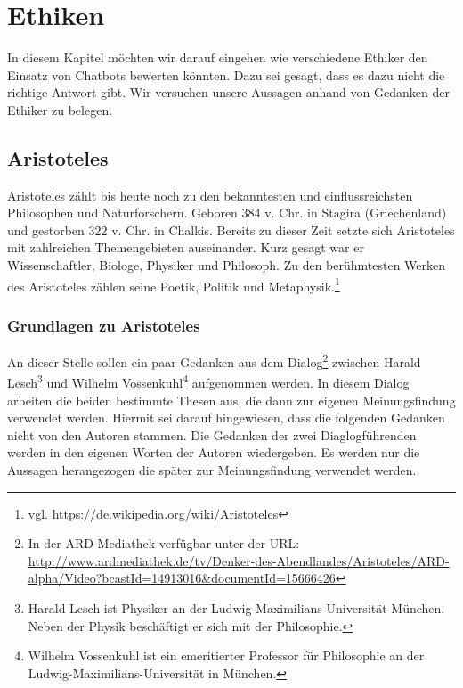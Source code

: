 \section{Ethiken}
In diesem Kapitel möchten wir darauf eingehen wie verschiedene Ethiker den Einsatz von Chatbots bewerten könnten. Dazu sei gesagt, dass es dazu nicht die richtige Antwort gibt. Wir versuchen unsere Aussagen anhand von Gedanken der Ethiker zu belegen. 

\subsection{Aristoteles}
Aristoteles zählt bis heute noch zu den bekanntesten und einflussreichsten Philosophen und Naturforschern. Geboren 384 v. Chr. in Stagira (Griechenland) und gestorben 322 v. Chr. in Chalkis. Bereits zu dieser Zeit setzte sich Aristoteles mit zahlreichen Themengebieten auseinander. Kurz gesagt war er Wissenschaftler, Biologe, Physiker und Philosoph. Zu den berühmtesten Werken des Aristoteles zählen seine Poetik, Politik und Metaphysik.\footnote{vgl. \url{https://de.wikipedia.org/wiki/Aristoteles}}


\subsubsection{Grundlagen zu Aristoteles}

An dieser Stelle sollen ein paar Gedanken aus dem Dialog\footnote{In der ARD-Mediathek verfügbar unter der URL: \url{http://www.ardmediathek.de/tv/Denker-des-Abendlandes/Aristoteles/ARD-alpha/Video?bcastId=14913016&documentId=15666426}} zwischen Harald Lesch\footnote{Harald Lesch ist Physiker an der Ludwig-Maximilians-Universität München. Neben der Physik beschäftigt er sich mit der Philosophie.} und Wilhelm Vossenkuhl\footnote{Wilhelm Vossenkuhl ist ein emeritierter Professor für Philosophie an der Ludwig-Maximilians-Universität in München.} aufgenommen werden. In diesem Dialog arbeiten die beiden bestimmte Thesen aus, die dann zur eigenen Meinungsfindung verwendet werden. Hiermit sei darauf hingewiesen, dass die folgenden Gedanken nicht von den Autoren stammen. Die Gedanken der zwei Diaglogführenden werden in den eigenen Worten der Autoren wiedergeben. Es werden nur die Aussagen herangezogen die später zur Meinungsfindung verwendet werden.

